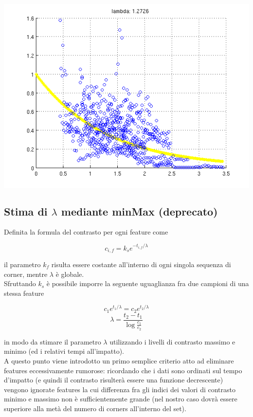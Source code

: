 \documentclass[12pt]{report}
\begin{document}
\begin{center}
	\includegraphics[scale=0.75]{images/ransacced.png}
	\label{fig:ransac}
\end{center}




\subsection{Stima di $\lambda$ mediante minMax (deprecato)}

\noindent Definita la formula del contrasto per ogni feature come

$$ c_{i,f} = k_se^{-t_{i,f}/\lambda} $$

\noindent il parametro $k_f$ risulta essere costante all'interno di ogni singola sequenza di corner, mentre $\lambda$ \`e globale.\\
\noindent Sfruttando $k_s$ \`e possibile imporre la seguente uguaglianza fra due campioni di una stessa feature

$$ c_1e^{t_1/\lambda} = c_2e^{t_2/\lambda} $$
$$ \lambda = \frac{t_2-t_1}{\log\frac{c_1}{c_2}} $$

\noindent in modo da stimare il parametro $\lambda$ utilizzando i livelli di contrasto massimo e minimo (ed i relativi tempi all'impatto).\\

\noindent A questo punto viene introdotto un primo semplice criterio atto ad eliminare features eccessivamente rumorose: ricordando che i dati sono ordinati sul tempo d'impatto (e quindi il contrasto risulter\`a essere una funzione decrescente) vengono ignorate features la cui differenza fra gli indici dei valori di contrasto minimo e massimo non \`e sufficientemente grande (nel nostro caso dovr\`a essere superiore alla met\`a del numero di corners all'interno del set).\\
\end{document}
